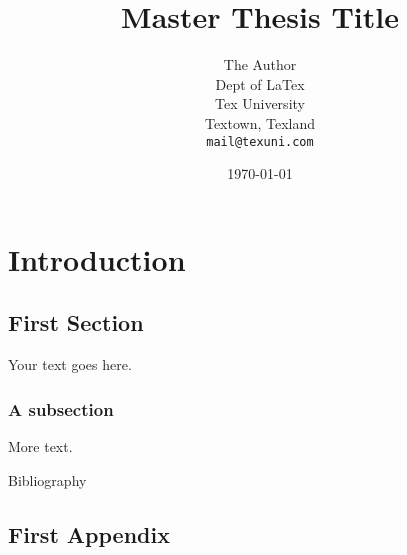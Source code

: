 \documentclass[11pt,titlepage,twoside,openright]{report}
\title{Master Thesis Title}
\author{The Author\\
	Dept of LaTex\\
	Tex University\\
	Textown, Texland\\
	\texttt{mail@texuni.com}}
\date{\today} %
\begin{document}
\maketitle
\tableofcontents
\newpage


\chapter{Introduction}

\section[TOC Name]{First Section}

Your text goes here.

\subsection{A subsection}

More text.


{Bibliography}




\appendix
\section{First Appendix}
\end{document}
